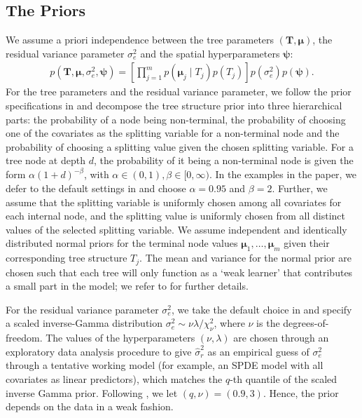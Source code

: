 \documentclass[preprint,12pt,authoryear]{elsarticle}
\begin{document}
\subsection{The Priors}
\label{sec:SBARTprior}
We assume a priori independence between the tree parameters $(\mathbf{T}, \boldsymbol{\mu})$, the residual variance parameter $\sigma_e^2$ and the spatial hyperparameters $\boldsymbol{\psi}$:
\begin{align*}
	p\left(\mathbf{T}, \boldsymbol{\mu}, \sigma_e^2, \boldsymbol{\psi}\right)=\left[\prod_{j=1}^m p\left(\boldsymbol{\mu}_j \mid T_j\right) p\left(T_j\right)\right] p\left(\sigma_e^2\right) p\left (\boldsymbol{\psi}\right).
\end{align*}
{For the tree parameters and the residual variance parameter, we follow the prior specifications in \cite{chipman1998bayesian} and decompose the tree structure prior into three hierarchical parts: the probability of a node being non-terminal, the probability of choosing one of the covariates as the splitting variable for a non-terminal node and the probability of choosing a splitting value given the chosen splitting variable. For a tree node at depth $d$, the probability of it being a non-terminal node is given the form $\alpha(1+d)^{-\beta}$, with $\alpha \in(0,1), \beta \in[0, \infty)$. In the  examples in the paper, we defer to the default settings in \cite{chipman2010bart} and choose $\alpha = 0.95$ and $\beta = 2$. Further, we assume that the splitting variable is uniformly chosen among all covariates for each internal node, and the splitting value is uniformly chosen from all distinct values of the selected splitting variable.} We assume independent and identically distributed normal priors for the terminal node values $\boldsymbol{\mu}_1, \dots, \boldsymbol{\mu}_m$ given their corresponding tree structure $T_j$. The mean and variance for the normal prior are chosen such that each tree will only function as a `weak learner' that contributes a small part in the model; we refer to \cite{chipman2010bart} for further details. 

For the residual variance parameter $\sigma_e^2$, we take the default choice in \cite{chipman2010bart} and specify a scaled inverse-Gamma distribution $\sigma_e^2 \sim \nu \lambda / \chi_\nu^2$, where $\nu$ is the degrees-of-freedom. The values of the hyperparameters $(\nu, \lambda)$ are chosen through an exploratory data analysis procedure to give $\hat{\sigma}_r^2$ as an empirical guess of $\sigma_e^2$ through a tentative working model (for example, an SPDE model with all covariates as linear predictors), which matches the $q$-th quantile of the scaled inverse Gamma prior. Following \cite{chipman2010bart}, we let $(q, \nu) = (0.9, 3)$. Hence, the prior depends on the data in a weak fashion. 
\end{document}
